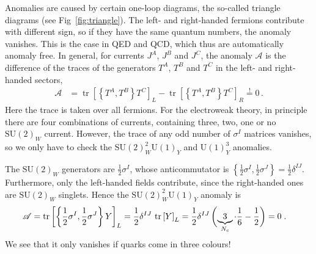 \documentclass[12pt]{report}
\def\clap#1{\hbox to 0pt{\hss#1\hss}}
\def\mathclap{\mathpalette\mathclapinternal}
\def\mathclapinternal#1#2{\clap{$\mathsurround=0pt#1{#2}$}}
\DeclareMathOperator{\tr}{tr}
\newcommand{\2}{\ensuremath{\sqrt{2}\,}}
\begin{document}
{        Anomalies are caused by certain one-loop diagrams, the so-called triangle diagrams
         (see Fig~\ref{fig:triangle}). The left- and right-handed fermions
        contribute with different sign, so if they have the same quantum numbers, the anomaly
        vanishes. This is the case in QED and QCD, which thus are automatically anomaly free. In
        general, for currents $J^A$, $J^B$ and $J^C$, the anomaly $\mathscr{A}$ is 
        the difference of the traces of the generators $T^A$, $T^B$ and $T^C$ in the
        left- and right-handed sectors,
        \begin{align}
          \mathscr{A} &= \tr \left[\left\{T^A, T^B\right\} T^C\right]_L - \tr
          \left[\left\{T^A, T^B\right\} T^C\right]_R \stackrel{!}{=} 0\,.
        \end{align}
        Here the trace is taken over all fermions. 
        For the electroweak theory, in principle there are four combinations of currents, containing
        three, two, one or no $\mathrm{SU(2)}_W$ current. However, the trace of any odd number of
        $\sigma^I$ matrices vanishes, so we only have to check the $\mathrm{SU(2)}_W^2
        \mathrm{U(1)}_Y$ and $\mathrm{U(1)}_Y^3$ anomalies.
        
        The $\mathrm{SU(2)}_W$ generators are $\frac{1}{2} \sigma^I$, whose anticommutator is
        $\left\{\frac{1}{2} \sigma^I, \frac{1}{2} \sigma^J\right\}
        =\frac{1}{2}\delta^{IJ}$. Furthermore, only the left-handed fields contribute, since the
        right-handed ones are $\mathrm{SU(2)}_W$ singlets. Hence the
        $\mathrm{SU(2)}_W^2\mathrm{U(1)}_Y$ anomaly is 
        \begin{align}
          \mathscr{A} &= \tr \left[\left\{\frac{1}{2} \sigma^I, \frac{1}{2} \sigma^J\right\}
            Y\right]_L = \frac{1}{2}\delta^{IJ}\, \tr\left[Y\right]_L =\frac{1}{2}\delta^{IJ}\,
          \biggl(\underbrace{3}_{\mathclap{N_c}}\cdot \frac{1}{6} -\frac{1}{2}\biggr)=0\;.
        \end{align}
        We see that it only vanishes if quarks come in three colours!

}
\end{document}
